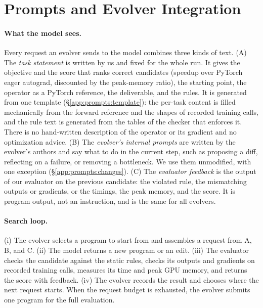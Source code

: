 \makeatletter
\newif\ifbench@restorecolumns
\if@twocolumn
  \bench@restorecolumnstrue
  \onecolumn
\else
  \bench@restorecolumnsfalse
\fi
\makeatother


\section{Prompts and Evolver Integration}
\label{app:prompts}

\paragraph{What the model sees.} Every request an evolver sends to the model combines three kinds of text. (A) The \emph{task statement} is written by us and fixed for the whole run. It gives the objective and the score that ranks correct candidates (speedup over PyTorch eager autograd, discounted by the peak-memory ratio), the starting point, the operator as a PyTorch reference, the deliverable, and the rules. It is generated from one template (\S\ref{app:prompts:template}): the per-task content is filled mechanically from the forward reference and the shapes of recorded training calls, and the rule text is generated from the tables of the checker that enforces it. There is no hand-written description of the operator or its gradient and no optimization advice. (B) The \emph{evolver's internal prompts} are written by the evolver's authors and say what to do in the current step, such as proposing a diff, reflecting on a failure, or removing a bottleneck. We use them unmodified, with one exception (\S\ref{app:prompts:changes}). (C) The \emph{evaluator feedback} is the output of our evaluator on the previous candidate: the violated rule, the mismatching outputs or gradients, or the timings, the peak memory, and the score. It is program output, not an instruction, and is the same for all evolvers.

\paragraph{Search loop.} (i) The evolver selects a program to start from and assembles a request from A, B, and C. (ii) The model returns a new program or an edit. (iii) The evaluator checks the candidate against the static rules, checks its outputs and gradients on recorded training calls, measures its time and peak GPU memory, and returns the score with feedback. (iv) The evolver records the result and chooses where the next request starts. When the request budget is exhausted, the evolver submits one program for the full evaluation.

